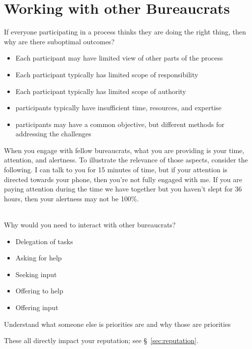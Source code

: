 \section{Working with other Bureaucrats\label{sec:working-with-other-bureaucrats}}

If everyone participating in a process thinks they are doing the right thing, then why are there suboptimal outcomes?
\begin{itemize}
    \item Each participant may have limited view of other parts of the process
    \item Each participant typically has limited scope of responsibility
    \item Each participant typically has limited scope of authority
    \item participants typically have insufficient time, resources, and expertise
    \item participants may have a common objective, but different methods for addressing the challenges
\end{itemize}


When you engage with fellow bureaucrats, what you are providing is your time, attention, and alertness. To illustrate the relevance of those aspects, consider the following. I can talk to you for 15 minutes of time, but if your attention is directed towards your phone, then you're not fully engaged with me. If you are paying attention during the time we have together but you haven't slept for 36 hours, then your alertness may not be 100\%. 

\ \\

Why would you need to interact with other bureaucrats?
\begin{itemize}
    \item Delegation of tasks
    \item Asking for help
    \item Seeking input
    \item Offering to help
    \item Offering input
\end{itemize}

Understand what someone else is priorities are and why those are priorities

These all directly impact your reputation; see \S~\ref{sec:reputation}.


